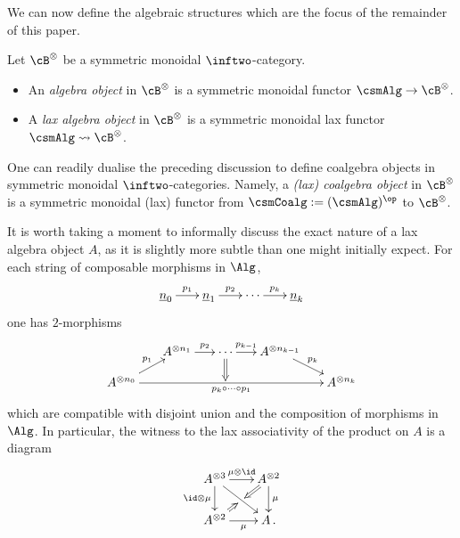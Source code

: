 \documentclass[a4paper]{article}
\numberwithin{equation}{section}
\begin{document}
We can now define the algebraic structures which are the focus of the remainder of this paper.
\begin{defn}
\label{DefnLaxAlg} \label{DefnLaxMAlg}
Let $\cB^\otimes$ be a symmetric monoidal $\inftwo$-category.
\begin{itemize}
 \item An {\em algebra object} in $\cB^\otimes$ is a symmetric monoidal functor $\csmAlg \to \cB^\otimes$.
  \item A {\em lax algebra object} in $\cB^\otimes$ is a symmetric monoidal lax functor $\csmAlg \rightsquigarrow \cB^\otimes$.
\end{itemize}
\end{defn}
\begin{remark}
 \label{CoalgRem}
 One can readily dualise the preceding discussion to define coalgebra objects in symmetric monoidal $\inftwo$-categories. Namely, a {\em (lax) coalgebra object} in $\cB^\otimes$ is a symmetric monoidal (lax) functor from $\csmCoalg := (\csmAlg)^\op$ to $\cB^\otimes$.
\end{remark}


It is worth taking a moment to informally discuss the exact nature of a lax algebra object $A$, as it is slightly more subtle than one might initially expect. For each string of composable morphisms in $\Alg$,
\begin{equation*}
 \xymatrixcolsep{1.5pc} \xymatrix{ \underline{n}_0 \ar[r]^-{p_1} & \underline{n}_1 \ar[r]^-{p_2} &  \cdots \ar[r]^-{p_k} & \underline{n}_k}
\end{equation*}
one has $2$-morphisms
\begin{equation*}
 \xymatrixrowsep{.9pc} \xymatrixcolsep{1.3pc} \xymatrix{ & A^{\otimes n_1} \ar[r]^-{p_2} & \cdots \ar[r]^-{p_{k-1}} \ar@{=>}[d] & A^{\otimes n_{k-1}} \ar[rd]^-{p_k} & \\
 A^{\otimes n_0}\ar[ru]^-{p_1} \ar[rrrr]_-{p_k \circ \cdots \circ p_1} & & & & A^{\otimes n_k} }
\end{equation*}
which are compatible with disjoint union and the composition of morphisms in $\Alg$. In particular, the witness to the lax associativity of the product on $A$ is a diagram
\begin{equation*}
 \xymatrixrowsep{.55pc}\xymatrixcolsep{.55pc} \xymatrix{ A^{\otimes 3} \ar[rr]^-{\mu \otimes \id} \ar[dd]_-{\id \otimes \mu} \ar[rrdd] & & A^{\otimes 2} \ar[dd]^-{\mu} \ar@{=>}[ld] \\
   & &  \\
   A^{\otimes 2} \ar@{=>}[ru] \ar[rr]_-{\mu} & & A\, .}
\end{equation*}
\end{document}
